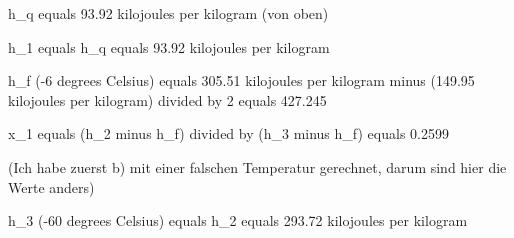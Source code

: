 h_q equals 93.92 kilojoules per kilogram (von oben)

h_1 equals h_q equals 93.92 kilojoules per kilogram

h_f (-6 degrees Celsius) equals 305.51 kilojoules per kilogram minus (149.95 kilojoules per kilogram) divided by 2 equals 427.245

x_1 equals (h_2 minus h_f) divided by (h_3 minus h_f) equals 0.2599

(Ich habe zuerst b) mit einer falschen Temperatur gerechnet, darum sind hier die Werte anders)

h_3 (-60 degrees Celsius) equals h_2 equals 293.72 kilojoules per kilogram